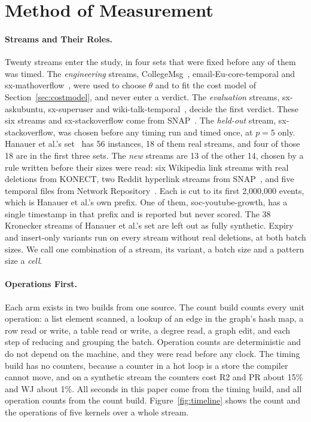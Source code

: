 \section{Method of Measurement}
\label{sec:method}

\paragraph{Streams and Their Roles.}
\label{sec:streams}
Twenty streams enter the study, in four sets that were fixed before any of them was timed.
The \emph{engineering} streams, CollegeMsg~\cite{panzarasa-collegemsg}, email-Eu-core-temporal and sx-mathoverflow~\cite{paranjape-motifs}, were used to choose $\theta$ and to fit the cost model of Section~\ref{sec:costmodel}, and never enter a verdict.
The \emph{evaluation} streams, sx-askubuntu, sx-superuser and wiki-talk-temporal~\cite{paranjape-motifs,leskovec-wiki-governance}, decide the first verdict.
These six streams and sx-stackoverflow come from SNAP~\cite{snap}.
The \emph{held-out} stream, sx-stackoverflow, was chosen before any timing run and timed once, at $p = 5$ only.
Hanauer et al.'s set~\cite{hanauer-dyncount} has 56 instances, 18 of them real streams, and four of those 18 are in the first three sets. The \emph{new} streams are 13 of the other 14, chosen by a rule written before their sizes were read: six Wikipedia link streams with real deletions from KONECT, two Reddit hyperlink streams from SNAP~\cite{kumar-reddit}, and five temporal files from Network Repository~\cite{network-repository}.
Each is cut to its first 2,000,000 events, which is Hanauer et al.'s own prefix.
One of them, soc-youtube-growth, has a single timestamp in that prefix and is reported but never scored.
The 38 Kronecker streams of Hanauer et al.'s set are left out as fully synthetic.
Expiry and insert-only variants run on every stream without real deletions, at both batch sizes.
We call one combination of a stream, its variant, a batch size and a pattern size a \emph{cell}.

\paragraph{Operations First.}
Each arm exists in two builds from one source.
The count build counts every unit operation: a list element scanned, a lookup of an edge in the graph's hash map, a row read or write, a table read or write, a degree read, a graph edit, and each step of reducing and grouping the batch.
Operation counts are deterministic and do not depend on the machine, and they were read before any clock.
The timing build has no counters, because a counter in a hot loop is a store the compiler cannot move, and on a synthetic stream the counters cost R2 and PR about 15\% and WJ about 1\%.
All seconds in this paper come from the timing build, and all operation counts from the count build.
Figure~\ref{fig:timeline} shows the count and the operations of five kernels over a whole stream.

